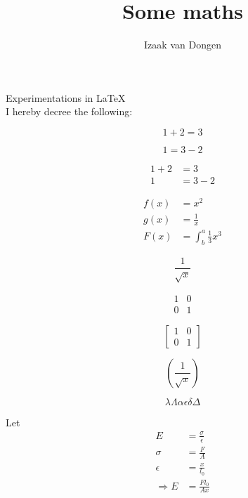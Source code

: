 \documentclass{article}
\title{Some maths}
\author{Izaak van Dongen}
\begin{document}
\maketitle
Experimentations in \LaTeX\\

I hereby decree the following:

\begin{equation*}
  1 + 2 = 3 
\end{equation*}

\begin{equation*}
  1 = 3 - 2
\end{equation*}

\begin{align*}
  1 + 2 &= 3\\
  1 &= 3 - 2
\end{align*}

\begin{align*}
  f(x) &= x^2\\
  g(x) &= \frac{1}{x}\\
  F(x) &= \int^a_b \frac{1}{3}x^3
\end{align*}

\begin{equation*}
\frac{1}{\sqrt{x}}
\end{equation*}

\begin{equation*}
\begin{matrix}
1 & 0\\
0 & 1
\end{matrix}
\end{equation*}

\begin{equation*}
\left[
\begin{matrix}
1 & 0\\
0 & 1
\end{matrix}
\right]
\end{equation*}

\begin{equation*}
\left(\frac{1}{\sqrt{x}}\right)
\end{equation*}

\begin{equation*}
\lambda \Lambda
\alpha
\epsilon
\delta \Delta
\end{equation*}

Let \begin{align*}
    E &= \frac{\sigma}{\epsilon}\\
    \sigma &= \frac{F}{A}\\
    \epsilon &= \frac{x}{l_0}\\
    \Rightarrow E &= \frac{Fl_0}{Ax}
\end{align*}
\end{document}
